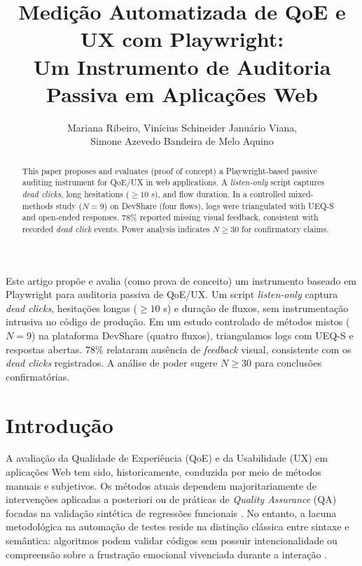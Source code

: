 \documentclass[12pt]{article}
\title{Medição Automatizada de QoE e UX com Playwright:\\
  Um Instrumento de Auditoria Passiva em Aplicações Web}
\author{Mariana Ribeiro\inst{1}, Vinícius Schineider Januário Viana\inst{1},\\
        Simone Azevedo Bandeira de Melo Aquino\inst{1}}
\begin{document}
\maketitle

\begin{abstract}
This paper proposes and evaluates (proof of concept) a Playwright-based passive
auditing instrument for QoE/UX in web applications. A \textit{listen-only} script
captures \textit{dead clicks}, long hesitations ($\geq 10$ s), and flow duration.
In a controlled mixed-methods study ($N = 9$) on DevShare (four flows), logs
were triangulated with UEQ-S and open-ended responses. 78\% reported missing
visual feedback, consistent with recorded \textit{dead click} events. Power
analysis indicates $N \geq 30$ for confirmatory claims.
\end{abstract}

\begin{resumo}
Este artigo propõe e avalia (como prova de conceito) um instrumento baseado em
Playwright para auditoria passiva de QoE/UX. Um script \textit{listen-only}
captura \textit{dead clicks}, hesitações longas ($\geq 10$ s) e duração de
fluxos, sem instrumentação intrusiva no código de produção. Em um estudo
controlado de métodos mistos ($N = 9$) na plataforma DevShare (quatro fluxos),
triangulamos logs com UEQ-S e respostas abertas. 78\% relataram ausência de
\textit{feedback} visual, consistente com os \textit{dead clicks} registrados.
A análise de poder sugere $N \geq 30$ para conclusões confirmatórias.
\end{resumo}

\section{Introdução}

A avaliação da Qualidade de Experiência (QoE) e da Usabilidade (UX) em aplicações Web tem sido, historicamente, conduzida por meio de métodos manuais e subjetivos. Os métodos atuais dependem majoritariamente de intervenções aplicadas a posteriori ou de práticas de \textit{Quality Assurance} (QA) focadas na validação sintética de regressões funcionais \cite{leppanen2024}. No entanto, a lacuna metodológica na automação de testes reside na distinção clássica entre sintaxe e semântica: algoritmos podem validar códigos sem possuir intencionalidade ou compreensão sobre a frustração emocional vivenciada durante a interação \cite{searle1982,rousi2019}.
\end{document}
